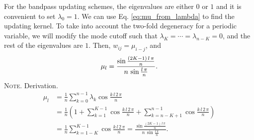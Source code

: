 \documentclass[reprint, superscriptaddress, floatfix]{revtex4-1}
\newcommand{\note}[1]{{\color{DarkGreen}\footnotesize \textsc{Note.} #1}}
\begin{document}
For the bandpass updating schemes,
the eigenvalues are either $0$ or $1$ and
it is convenient to set $\lambda_0 = 1$.
%
We can use Eq. \eqref{eq:mu_from_lambda}
to find the updating kernel.
%
To take into account the two-fold degeneracy
for a periodic variable,
we will modify the mode cutoff such that
$\lambda_{K} = \cdots = \lambda_{n-K} = 0$,
and the rest of the eigenvalues are $1$.
%
Then, $w_{ij} = \mu_{i-j}$, and
\begin{equation}
  \mu_l
  =
  \frac{
    \sin
    \frac{ (2 K - 1) \, l \, \pi }
         {              n        }
  }
  {
    n \, \sin \frac{ l \, \pi } { n }
  }
  .
\notag
\end{equation}
%
\note{Derivation.
\begin{align*}
\mu_l
&=
\frac 1 n \sum_{k = 0}^{n-1} \lambda_k \cos \frac{ k \, l \, 2 \, \pi } { n }
\\
&=
\frac{1}{n}
\left(
  1 +
  \sum_{k=1}^{K-1}
  \cos \frac { k \, l \, 2 \, \pi } { n }
  +
  \sum_{k=n-K+1}^{n-1}
  \cos \frac { k \, l \, 2 \, \pi } { n }
\right)
\\
&=
\frac 1 n
\sum_{k=1-K}^{K-1}
\cos \frac { k \, l \, 2 \, \pi } { n }
=
  \frac{
    \sin
    \frac{ (2 K - 1) \, l \, \pi }
         {              n        }
  }
  {
    n \, \sin \frac{ l \, \pi } { n }
  }
.
\end{align*}
}
\end{document}
